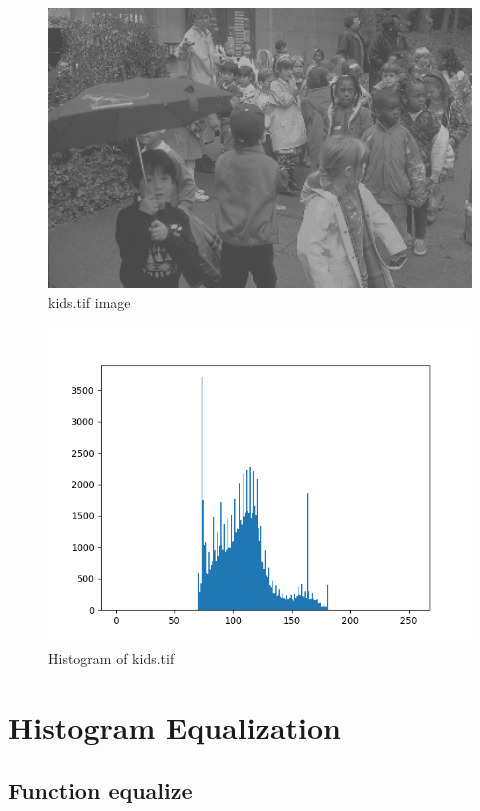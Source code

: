 \documentclass{article}
\begin{document}
\begin{figure}[H]
    \centering
    \includegraphics[width=1\textwidth]{../kids.png}
    \caption{kids.tif image}
\end{figure}
\begin{figure}[H]
    \centering
    \includegraphics[width=1\textwidth]{../kids-histogram.png}
    \caption{Histogram of kids.tif}
\end{figure}



\section{Histogram Equalization}
\subsection{Function equalize}

\end{document}

